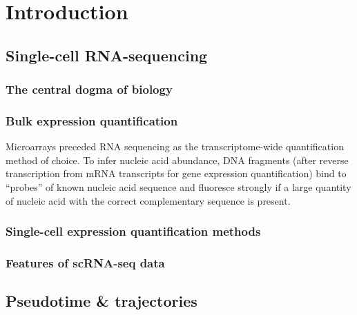 \chapter{Introduction}\label{ch:introduction}

\section{Single-cell RNA-sequencing}

\subsection{The central dogma of biology}



\subsection{Bulk expression quantification}



Microarrays preceded RNA sequencing as the transcriptome-wide quantification method of choice. To infer nucleic acid abundance, DNA fragments (after reverse transcription from mRNA transcripts for gene expression quantification) bind to ``probes'' of known nucleic acid sequence and fluoresce strongly if a large quantity of nucleic acid with the correct complementary sequence is present.


\subsection{Single-cell expression quantification methods}

\subsection{Features of scRNA-seq data}



\section{Pseudotime \& trajectories}

